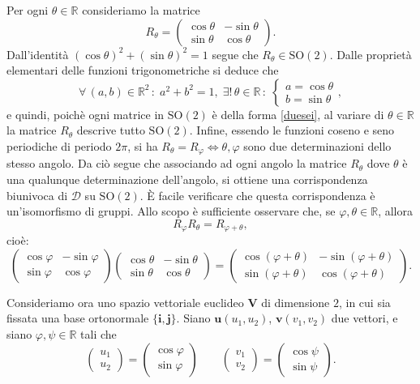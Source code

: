 \documentclass{article}
\theoremstyle{plain}
\theoremstyle{definition}
\theoremstyle{remark}
\begin{document}
Per ogni $\theta \in \mathbb{R}$ consideriamo la matrice
\[R_\theta = \begin{pmatrix}
\cos\theta & -\sin\theta \\
\sin\theta & \cos\theta
\end{pmatrix}.\]
Dall'identità $(\cos\theta)^2 + (\sin\theta)^2 = 1$ segue che $R_\theta \in \text{SO}(2)$. 
Dalle proprietà elementari delle funzioni trigonometriche si deduce che 
\[\forall\,(a, b) \in \mathbb{R}^2\,:\;a^2 + b^2 = 1,\;\exists!\,\theta \in \mathbb{R}\,:\;\begin{cases}a = \cos\theta\\b = \sin\theta\end{cases},\]
e quindi, poichè ogni matrice in $\mathrm{SO}(2)$ è della forma \ref{duesei}, al variare di 
$\theta \in \mathbb{R}$ la matrice $R_\theta$ descrive tutto $\mathrm{SO}(2)$.
Infine, essendo le funzioni coseno e seno periodiche di periodo $2\pi$, si ha 
$R_\theta = R_\varphi\iff\theta,\varphi$ sono due determinazioni dello stesso angolo. 
Da ciò segue che associando ad ogni angolo la matrice $R_\theta$ dove $\theta$ è una qualunque 
determinazione dell'angolo, si ottiene una corrispondenza biunivoca di $\mathcal{D}$ su $\mathrm{SO}(2)$. 
È facile verificare che questa corrispondenza è un'isomorfismo di gruppi. Allo scopo è sufficiente osservare che, se $\varphi, \theta \in \mathbb{R}$, allora
\[R_\varphi R_\theta = R_{\varphi + \theta},\]
cioè:
\begin{equation}\label{diciassetteundici}
\begin{pmatrix}
\cos\varphi & -\sin\varphi \\
\sin\varphi & \cos\varphi
\end{pmatrix}
\begin{pmatrix}
\cos\theta & -\sin\theta \\
\sin\theta & \cos\theta
\end{pmatrix}
=
\begin{pmatrix}
\cos(\varphi + \theta) & -\sin(\varphi + \theta) \\
\sin(\varphi + \theta) & \cos(\varphi + \theta)
\end{pmatrix}. 
\end{equation}

\vspace{10pt}

Consideriamo ora uno spazio vettoriale euclideo $\mathbf{V}$ di dimensione $2$, in cui sia fissata una base 
ortonormale $\{\mathbf{i}, \mathbf{j}\}$. Siano $\mathbf{u}(u_1, u_2)$, $\mathbf{v}(v_1, v_2)$ due vettori, 
e siano $\varphi, \psi \in \mathbb{R}$ tali che
\[\begin{pmatrix}u_1\\u_2\end{pmatrix} = \begin{pmatrix}\cos\varphi\\\sin\varphi\end{pmatrix} \quad\quad\begin{pmatrix}v_1\\v_2\end{pmatrix} = \begin{pmatrix}\cos\psi\\\sin\psi\end{pmatrix}.\]
\end{document}
